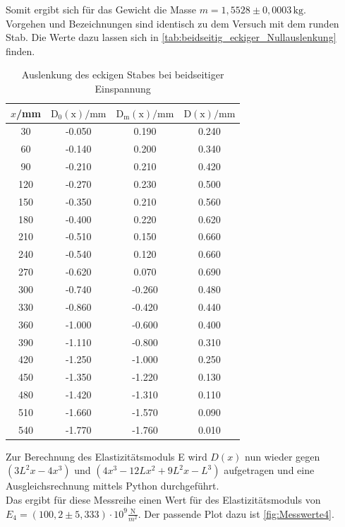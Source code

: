   Somit ergibt sich für das Gewicht die Masse $m = 1{,}5528 \pm 0,0003 \, \mathrm{kg}$.\\

  Vorgehen und Bezeichnungen sind identisch zu dem Versuch mit dem runden Stab. Die Werte dazu lassen
  sich in \autoref{tab:beidseitig_eckiger_Nullauslenkung} finden.\\

  \begin{table}
    \centering
    \caption{Auslenkung des eckigen Stabes bei beidseitiger Einspannung}
    \label{tab:beidseitig_eckiger_Nullauslenkung}
    \begin{tabular}{c c c c}
      \toprule
      $x$/mm & $\mathrm{D_0(x)}/\mathrm{mm}$ & $\mathrm{D_m(x)}/\mathrm{mm}$ & $\mathrm{D(x)}/\mathrm{mm}$ \\
      \midrule
      30 & -0.050 & 0.190 & 0.240 \\
      60 & -0.140 & 0.200 & 0.340 \\
      90 & -0.210 & 0.210 & 0.420\\
      120 & -0.270 & 0.230 & 0.500\\
      150 & -0.350 & 0.210 & 0.560 \\
      180 & -0.400 & 0.220 & 0.620 \\
      210 & -0.510 & 0.150 & 0.660 \\
      240 & -0.540 & 0.120 & 0.660 \\
      270 & -0.620 & 0.070 & 0.690 \\
      300 & -0.740 & -0.260 & 0.480\\
      330 & -0.860 & -0.420 & 0.440\\
      360 & -1.000 & -0.600 & 0.400\\
      390 & -1.110 & -0.800 & 0.310\\
      420 & -1.250 & -1.000 & 0.250 \\
      450 & -1.350 & -1.220 & 0.130\\
      480 & -1.420 & -1.310 & 0.110\\
      510 & -1.660 & -1.570 & 0.090\\
      540 & -1.770 & -1.760 & 0.010\\
      \bottomrule
    \end{tabular}
  \end{table}

  Zur Berechnung des Elastizitätsmoduls E wird $D(x)$ nun wieder gegen $\left(3L^2x -4x^3\right)$ und $\left(4x^3 -12Lx^2 +9L^2 x - L^3\right)$ aufgetragen und eine Ausgleichsrechnung mittels Python durchgeführt.\\
  Das ergibt für diese Messreihe einen Wert für des Elastizitätsmoduls von $E_4 = (100{,}2 \pm 5{,}333) \cdot \mathrm{10^{9}} \frac{\mathrm{N}}{m^2}$. Der passende Plot dazu ist
  \autoref{fig:Messwerte4}.

